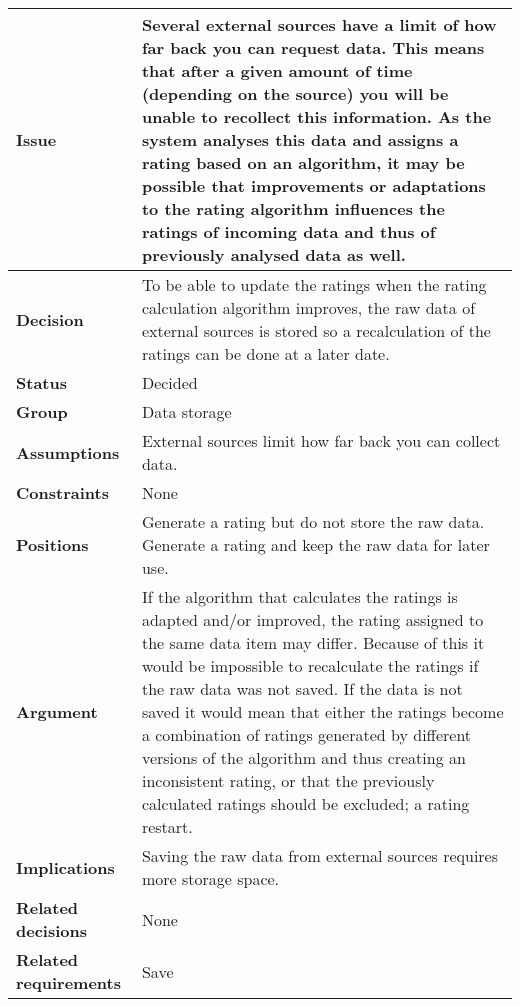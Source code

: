 
\label{dd:save-raw}
\begin{tabular}{ l  p{10cm}}
\hline
\bf Issue & Several external sources have a limit of how far back you can request data. This means that after a given amount of time (depending on the source) you will be unable to recollect this information. As the system analyses this data and assigns a rating based on an algorithm, it may be possible that improvements or adaptations to the rating algorithm influences the ratings of incoming data and thus of previously analysed data as well. \\
\hline
\bf Decision & To be able to update the ratings when the rating calculation algorithm improves, the raw data of external sources is stored so a recalculation of the ratings can be done at a later date. \\
\hline
\bf Status & Decided \\
\hline
\bf Group & Data storage \\
\hline
\bf Assumptions & External sources limit how far back you can collect data. \\
\hline
\bf Constraints & None\\
\hline
\bf Positions & Generate a rating but do not store the raw data. \newline \newline
Generate a rating and keep the raw data for later use. \\
\hline
\bf Argument & If the algorithm that calculates the ratings is adapted and/or improved, the rating assigned to the same data item may differ. Because of this it would be impossible to recalculate the ratings if the raw data was not saved. \newline
If the data is not saved it would mean that either the ratings become a combination of ratings generated by different versions of the algorithm and thus creating an inconsistent rating, or that the previously calculated ratings should be excluded; a rating restart. \\
\hline
\bf Implications & Saving the raw data from external sources requires more storage space. \\
\hline
\bf Related decisions & None \\
\hline
\bf Related requirements & Save \\
\hline
\end{tabular}
